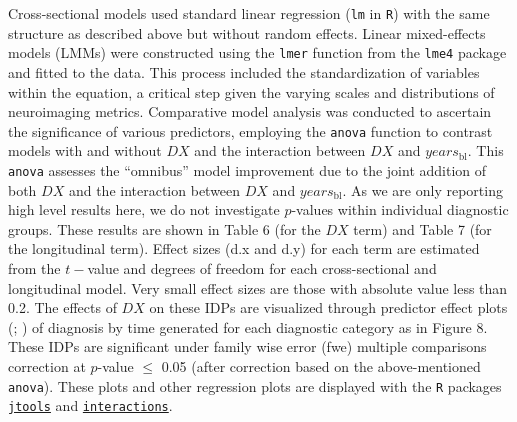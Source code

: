 \documentclass[
  table]{article}
\begin{document}
Cross-sectional models used standard linear regression (\texttt{lm} in
\texttt{R}) with the same structure as described above but without
random effects. Linear mixed-effects models (LMMs) were constructed
using the \texttt{lmer} function from the \texttt{lme4} package and
fitted to the data. This process included the standardization of
variables within the equation, a critical step given the varying scales
and distributions of neuroimaging metrics. Comparative model analysis
was conducted to ascertain the significance of various predictors,
employing the \texttt{anova} function to contrast models with and
without \(DX\) and the interaction between \(DX\) and
\(years_\text{bl}\). This \texttt{anova} assesses the ``omnibus'' model
improvement due to the joint addition of both \(DX\) and the interaction
between \(DX\) and \(years_\text{bl}\). As we are only reporting high
level results here, we do not investigate \(p\)-values within individual
diagnostic groups. These results are shown in Table 6 (for the \(DX\)
term) and Table 7 (for the longitudinal term). Effect sizes (d.x and
d.y) for each term are estimated from the \(t-\)value and degrees of
freedom for each cross-sectional and longitudinal model. Very small
effect sizes are those with absolute value less than 0.2. The effects of
\(DX\) on these IDPs are visualized through predictor effect plots
(;
) of diagnosis by time
generated for each diagnostic category as in Figure 8. These IDPs are
significant under family wise error (fwe) multiple comparisons
correction at \(p\)-value \(\le\) 0.05 (after correction based on the
above-mentioned \texttt{anova}). These plots and other regression plots
are displayed with the \texttt{R} packages
\href{https://jtools.jacob-long.com}{\texttt{jtools}} and
\href{https://interactions.jacob-long.com}{\texttt{interactions}}.

\setcounter{table}{5} \renewcommand{\thetable}{\arabic{table}}
\end{document}
